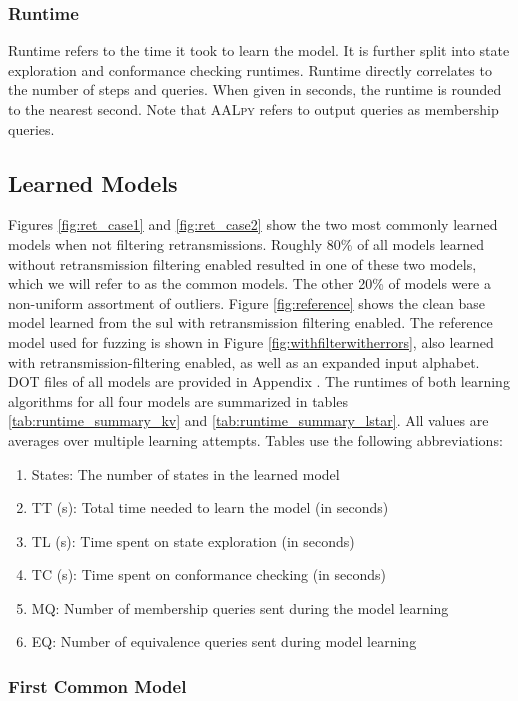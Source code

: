 \subsubsection*{Runtime}
Runtime refers to the time it took to learn the model. It is further split into state exploration and conformance checking runtimes. Runtime directly correlates to the number of steps and queries. When given in seconds, the runtime is rounded to the nearest second. Note that \textsc{AALpy} refers to output queries as membership queries.


\subsection{Learned Models} \label{subsec:models}
Figures \ref{fig:ret_case1} and \ref{fig:ret_case2} show the two most commonly learned models when not filtering retransmissions. Roughly 80\% of all models learned without retransmission filtering enabled resulted in one of these two models, which we will refer to as the common models. The other 20\% of models were a non-uniform assortment of outliers. Figure \ref{fig:reference} shows the clean base model learned from the \ac{sul} with retransmission filtering enabled. The reference model used for fuzzing is shown in Figure \ref{fig:withfilterwitherrors}, also learned with retransmission-filtering enabled, as well as an expanded input alphabet. DOT files of all models are provided in Appendix . The runtimes of both learning algorithms for all four models are summarized in tables \ref{tab:runtime_summary_kv} and \ref{tab:runtime_summary_lstar}. All values are averages over multiple learning attempts. Tables use the following abbreviations:

\begin{enumerate}
	\item States: The number of states in the learned model
	\item TT (s): Total time needed to learn the model (in seconds)
	\item TL (s): Time spent on state exploration (in seconds)
	\item TC (s): Time spent on conformance checking (in seconds)
	\item MQ: Number of membership queries sent during the model learning
	\item EQ: Number of equivalence queries sent during model learning
\end{enumerate}
 

\subsubsection*{First Common Model}

